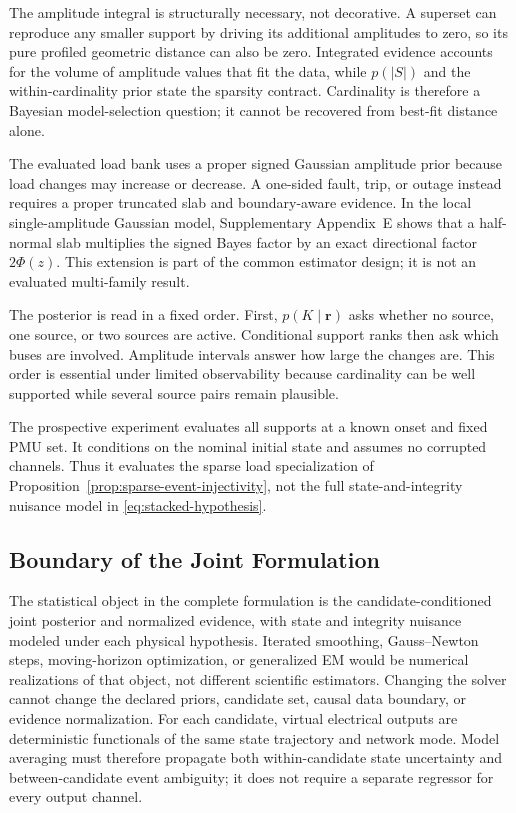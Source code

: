 The amplitude integral is structurally necessary, not decorative. A superset can
reproduce any smaller support by driving its additional amplitudes to zero, so its
pure profiled geometric distance can also be zero. Integrated evidence accounts
for the volume of amplitude values that fit the data, while $p(|S|)$ and the
within-cardinality prior state the sparsity contract. Cardinality is therefore a
Bayesian model-selection question; it cannot be recovered from best-fit distance
alone.

The evaluated load bank uses a proper signed Gaussian amplitude prior because
load changes may increase or decrease. A one-sided fault, trip, or outage instead
requires a proper truncated slab and boundary-aware evidence. In the local
single-amplitude Gaussian model, Supplementary Appendix~E shows that a
half-normal slab multiplies the signed Bayes factor by an exact directional
factor $2\Phi(z)$. This extension is part of the common estimator design; it is
not an evaluated multi-family result.

The posterior is read in a fixed order. First, $p(K\mid\bm r)$ asks whether no source, one source, or two sources are active. Conditional support ranks then ask which buses are involved. Amplitude intervals answer how large the changes are. This order is essential under limited observability because cardinality can be well supported while several source pairs remain plausible.

The prospective experiment evaluates all \GlobalHypothesisCount{} supports at a known onset and fixed PMU set. It conditions on the nominal initial state and assumes no corrupted channels. Thus it evaluates the sparse load specialization of Proposition~\ref{prop:sparse-event-injectivity}, not the full state-and-integrity nuisance model in \eqref{eq:stacked-hypothesis}.

\subsection{Boundary of the Joint Formulation}

The statistical object in the complete formulation is the
candidate-conditioned joint posterior and normalized evidence, with state and
integrity nuisance modeled under each physical hypothesis. Iterated smoothing,
Gauss--Newton steps, moving-horizon optimization, or generalized EM would be
numerical realizations of that object, not different scientific estimators.
Changing the solver cannot change the declared priors, candidate set, causal
data boundary, or evidence normalization.
For each candidate, virtual electrical outputs are deterministic functionals of
the same state trajectory and network mode. Model averaging must therefore
propagate both within-candidate state uncertainty and between-candidate event
ambiguity; it does not require a separate regressor for every output channel.

